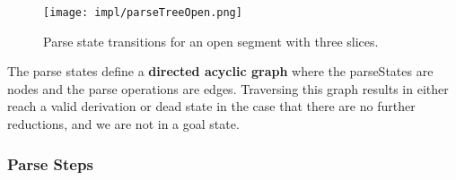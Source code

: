 \documentclass[12pt,a4paper,twoside,openright]{report}
\theoremstyle{definition}
\begin{document}
\begin{figure}[h]
  \centering
  \texttt{[image: impl/parseTreeOpen.png]}
  \caption{Parse state transitions for an open segment with three slices.}
  \label{fig:statetrans}
\end{figure}

The parse states define a \textbf{directed acyclic graph} where the parseStates are nodes and the parse operations are edges. 
Traversing this graph results in either reach a valid derivation or dead state in the case that there are no further reductions, and we are not in a goal state. 



\subsubsection{Parse Steps}
\end{document}
